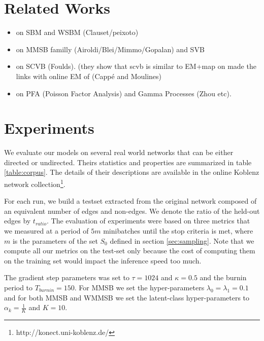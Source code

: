 \section{Related Works}

\begin{itemize}
\item on SBM and WSBM (Clauset/peixoto)
\item on MMSB familly (Airoldi/Blei/Mimmo/Gopalan) and SVB
\item on SCVB (Foulds). (they show that scvb is similar to EM+map on made the links with online EM of (Cappé and Moulines)
\item on PFA (Poisson Factor Analysis) and Gamma Processes (Zhou etc).
\end{itemize}







\section{Experiments}

%
%


We evaluate our models on several real world networks that can be either directed or undirected. Theirs statistics and properties are summarized in table \ref{table:corpus}. The details of their descriptions are available in the online Koblenz network collection\footnote{http://konect.uni-koblenz.de/}.

\begin{table}
\bgroup
\def\arraystretch{1} %
	\label{table:corpus}
	
\egroup
\end{table}


%
%

For each run, we build a testset extracted from the original network composed of an equivalent number of edges and non-edges. We denote the ratio of the held-out edges by $t_{ratio}$. The evaluation of experiments were based on three metrics that we measured at a period of $5m$ minibatches until the stop criteria is met, where $m$ is the parameters of the set $S_0$ defined in section \ref{sec:sampling}.
Note that we compute all our metrics on the test-set only because the cost of computing them on the training set would impact the inference speed too much.

The gradient step parameters was set to $\tau=1024$ and $\kappa=0.5$ and the burnin period  to $T_{burnin}=150$. For MMSB we set the hyper-parameters $\lambda_0=\lambda_1=0.1$ and for both MMSB and WMMSB we set the latent-class hyper-parameters to $\alpha_k=\frac{1}{K}$ and $K=10$.


